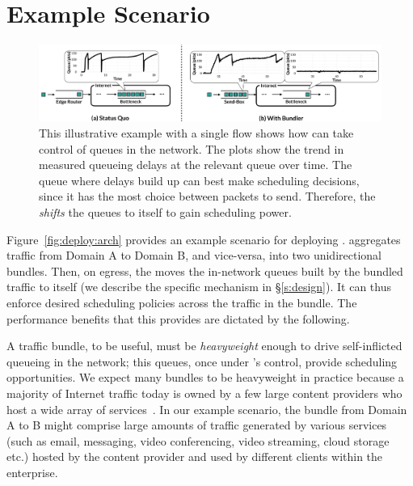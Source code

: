 \section{Example Scenario}\label{s:deploy}
\begin{figure}[t]
    \centering
    \includegraphics[width=\textwidth]{img/shift-bottleneck-combined}
    \caption{This illustrative example with a single flow shows how \name can take control of queues in the network. The plots show the trend in measured queueing delays at the relevant queue over time. The queue where delays build up can best make scheduling decisions, since it has the most choice between packets to send. Therefore, the \inbox \emph{shifts} the queues to itself to gain scheduling power. }\label{fig:design:shift-bottleneck}
\end{figure}
%

Figure~\ref{fig:deploy:arch} provides an example scenario for deploying \name. 
\name aggregates traffic from Domain A to Domain B, and vice-versa, into two unidirectional bundles. 
Then, on egress, the \inbox moves the in-network queues built by the bundled traffic to itself (we describe the specific mechanism in \S\ref{s:design}). 
It can thus enforce desired scheduling policies across the traffic in the bundle.
The performance benefits that this provides are dictated by the following.

A traffic bundle, to be useful, must be \emph{heavyweight} enough to drive self-inflicted queueing in the network; this queues, once under \name's control, provide scheduling opportunities. We expect many bundles to be heavyweight in practice because a majority of Internet traffic today is owned by a few large content providers who host a wide array of services~\cite{fivecomps, labovitz}. 
In our example scenario, the bundle from Domain A to B might comprise large amounts of traffic generated by various services (such as email, messaging, video conferencing, video streaming, cloud storage etc.) hosted by the content provider and used by different clients within the enterprise. 

